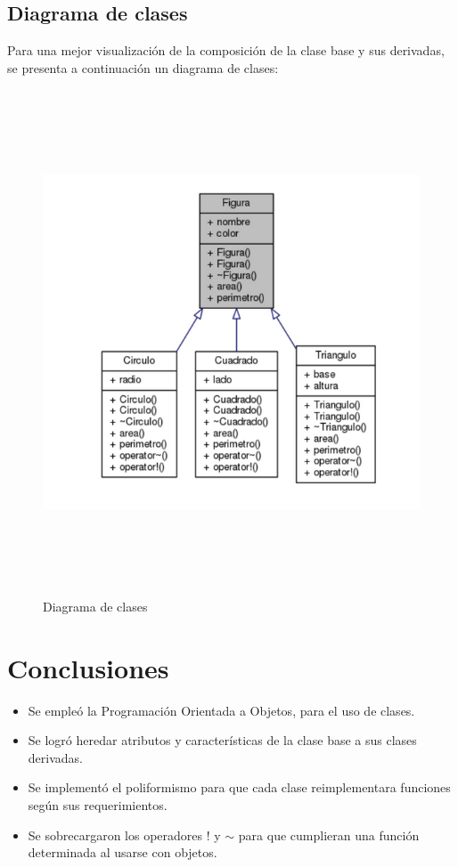 \documentclass[11pt]{article}
\begin{document}
\newpage
\subsection{Diagrama de clases}
Para una mejor visualización de la composición de la clase base y sus derivadas, se presenta a continuación un diagrama de clases:

\begin{figure}[H]
\centering
\includegraphics[height=15cm, width=\textwidth]{img/DC.png}
\caption{Diagrama de clases}
\label{fig:diagrama}
\end{figure}


\newpage
\section{Conclusiones}
\begin{itemize}
\item Se empleó la Programación Orientada a Objetos, para el uso de clases.
\item Se logró heredar atributos y características de la clase base a sus clases derivadas.
\item Se implementó el poliformismo para que cada clase reimplementara funciones según sus requerimientos.
\item Se sobrecargaron los operadores ! y $\sim$ para que cumplieran una función determinada al usarse con objetos.
\end{itemize}
\end{document}
